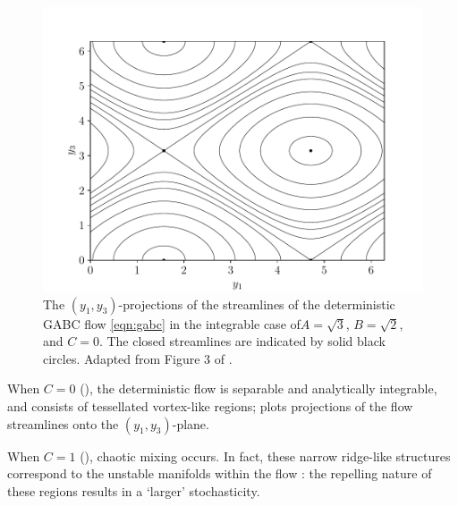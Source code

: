 \begin{figure}
	\centering
	\includegraphics[width=\textwidth]{chp04_paper_numerics/figures/gabc/streamlines_integrable}
	\caption{The \((y_1,y_3)\)-projections of the streamlines of the deterministic GABC flow \cref{eqn:gabc} in the integrable case of\(A = \sqrt{3}\), \(B = \sqrt{2}\), and \(C = 0\).
		The closed streamlines are indicated by solid black circles.
		Adapted from Figure 3 of \citet{DombreEtAl_1986_ChaoticStreamlinesABC}.}
	\label{fig:}
\end{figure}

When \(C = 0\) (), the deterministic flow is separable and analytically integrable, and consists of tessellated vortex-like regions;  plots projections of the flow streamlines onto the \((y_1,y_3)\)-plane.


When \(C = 1\) (), chaotic mixing occurs.
In fact, these narrow ridge-like structures correspond to the unstable manifolds within the flow \citep{DombreEtAl_1986_ChaoticStreamlinesABC}: the repelling nature of these regions results in a `larger' stochasticity.
